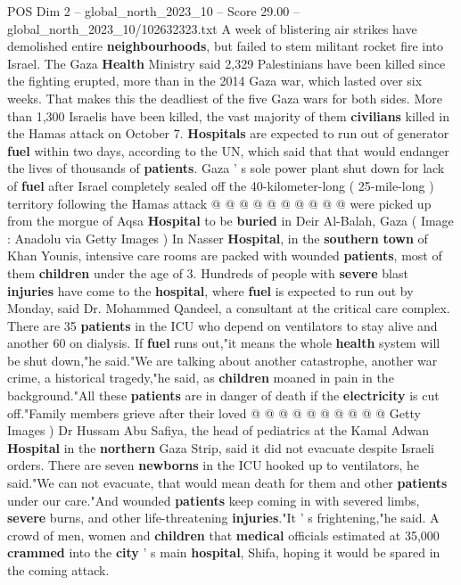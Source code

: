 \begin{textsample}{POS Dim 2 – global\_north\_2023\_10 – Score 29.00 – global\_north\_2023\_10/102632323.txt}
A week of blistering air strikes have demolished entire \textbf{neighbourhoods}, but failed to stem militant rocket fire into Israel.
The Gaza \textbf{Health} Ministry said 2,329 Palestinians have been killed since the fighting erupted, more than in the 2014 Gaza war, which lasted over six weeks.
That makes this the deadliest of the five Gaza wars for both sides.
More than 1,300 Israelis have been killed, the vast majority of them \textbf{civilians} killed in the Hamas attack on October 7. \textbf{Hospitals} are expected to run out of generator \textbf{fuel} within two days, according to the UN, which said that that would endanger the lives of thousands of \textbf{patients}.
Gaza ' s sole power plant shut down for lack of \textbf{fuel} after Israel completely sealed off the 40-kilometer-long ( 25-mile-long ) territory following the Hamas attack @ @ @ @ @ @ @ @ @ @ were picked up from the morgue of Aqsa \textbf{Hospital} to be \textbf{buried} in Deir Al-Balah, Gaza ( Image : Anadolu via Getty Images ) In Nasser \textbf{Hospital}, in the \textbf{southern} \textbf{town} of Khan Younis, intensive care rooms are packed with wounded \textbf{patients}, most of them \textbf{children} under the age of 3.
Hundreds of people with \textbf{severe} blast \textbf{injuries} have come to the \textbf{hospital}, where \textbf{fuel} is expected to run out by Monday, said Dr.
Mohammed Qandeel, a consultant at the critical care complex.
There are 35 \textbf{patients} in the ICU who depend on ventilators to stay alive and another 60 on dialysis.
If \textbf{fuel} runs out,"it means the whole \textbf{health} system will be shut down,"he said."We are talking about another catastrophe, another war crime, a historical tragedy,"he said, as \textbf{children} moaned in pain in the background."All these \textbf{patients} are in danger of death if the \textbf{electricity} is cut off."Family members grieve after their loved @ @ @ @ @ @ @ @ @ @ Getty Images ) Dr Hussam Abu Safiya, the head of pediatrics at the Kamal Adwan \textbf{Hospital} in the \textbf{northern} Gaza Strip, said it did not evacuate despite Israeli orders.
There are seven \textbf{newborns} in the ICU hooked up to ventilators, he said."We can not evacuate, that would mean death for them and other \textbf{patients} under our care."And wounded \textbf{patients} keep coming in with severed limbs, \textbf{severe} burns, and other life-threatening \textbf{injuries}."It ' s frightening,"he said.
A crowd of men, women and \textbf{children} that \textbf{medical} officials estimated at 35,000 \textbf{crammed} into the \textbf{city} ' s main \textbf{hospital}, Shifa, hoping it would be spared in the coming attack.

\end{textsample}
